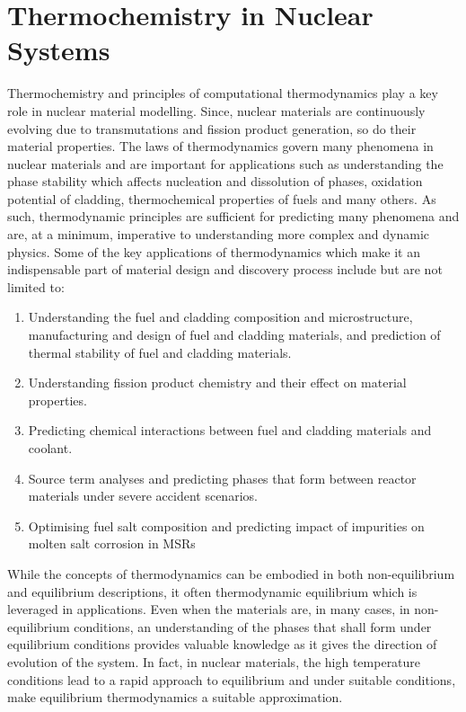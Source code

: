\section{Thermochemistry in Nuclear Systems}
	Thermochemistry and principles of computational thermodynamics play a key role in nuclear material modelling. Since, nuclear materials are continuously evolving due to transmutations and fission product generation, so do their material properties. The laws of thermodynamics govern many phenomena in nuclear materials and are important for applications such as understanding the phase stability which affects nucleation and dissolution of phases, oxidation potential of cladding,  thermochemical properties of fuels and many others. As such, thermodynamic principles are sufficient for predicting many phenomena and are, at a minimum, imperative to understanding more complex and dynamic physics. Some of the key applications of thermodynamics which make it an indispensable part of material design and discovery process include but are not limited to:
	\begin{enumerate}
		\item Understanding the fuel and cladding composition and microstructure, manufacturing and design of fuel and cladding materials, and prediction of thermal stability of fuel and cladding materials.
		\item Understanding fission product chemistry and their effect on material properties.
		\item Predicting chemical interactions between fuel and cladding materials and coolant.
		\item Source term analyses and predicting phases that form between reactor materials under severe accident scenarios.
		\item Optimising fuel salt composition and predicting impact of impurities on molten salt corrosion in MSRs
	\end{enumerate}
	
	While the concepts of thermodynamics can be embodied in both non-equilibrium and equilibrium descriptions, it often thermodynamic equilibrium which is leveraged in applications. Even when the materials are, in many cases, in non-equilibrium conditions, an understanding of the phases that shall form under equilibrium conditions provides valuable knowledge as it gives the direction of evolution of the system.  In fact, in nuclear materials, the high temperature conditions lead to a rapid approach to equilibrium and under suitable conditions, make equilibrium thermodynamics a suitable approximation.
	
